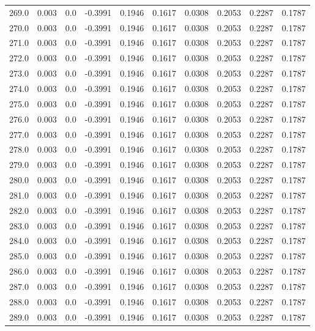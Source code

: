 \begin{longtable}{lrrrrrrrrr}
269.0 & 0.003 & 0.0 & -0.3991 & 0.1946 & 0.1617 & 0.0308 & 0.2053 & 0.2287 & 0.1787 \\
270.0 & 0.003 & 0.0 & -0.3991 & 0.1946 & 0.1617 & 0.0308 & 0.2053 & 0.2287 & 0.1787 \\
271.0 & 0.003 & 0.0 & -0.3991 & 0.1946 & 0.1617 & 0.0308 & 0.2053 & 0.2287 & 0.1787 \\
272.0 & 0.003 & 0.0 & -0.3991 & 0.1946 & 0.1617 & 0.0308 & 0.2053 & 0.2287 & 0.1787 \\
273.0 & 0.003 & 0.0 & -0.3991 & 0.1946 & 0.1617 & 0.0308 & 0.2053 & 0.2287 & 0.1787 \\
274.0 & 0.003 & 0.0 & -0.3991 & 0.1946 & 0.1617 & 0.0308 & 0.2053 & 0.2287 & 0.1787 \\
275.0 & 0.003 & 0.0 & -0.3991 & 0.1946 & 0.1617 & 0.0308 & 0.2053 & 0.2287 & 0.1787 \\
276.0 & 0.003 & 0.0 & -0.3991 & 0.1946 & 0.1617 & 0.0308 & 0.2053 & 0.2287 & 0.1787 \\
277.0 & 0.003 & 0.0 & -0.3991 & 0.1946 & 0.1617 & 0.0308 & 0.2053 & 0.2287 & 0.1787 \\
278.0 & 0.003 & 0.0 & -0.3991 & 0.1946 & 0.1617 & 0.0308 & 0.2053 & 0.2287 & 0.1787 \\
279.0 & 0.003 & 0.0 & -0.3991 & 0.1946 & 0.1617 & 0.0308 & 0.2053 & 0.2287 & 0.1787 \\
280.0 & 0.003 & 0.0 & -0.3991 & 0.1946 & 0.1617 & 0.0308 & 0.2053 & 0.2287 & 0.1787 \\
281.0 & 0.003 & 0.0 & -0.3991 & 0.1946 & 0.1617 & 0.0308 & 0.2053 & 0.2287 & 0.1787 \\
282.0 & 0.003 & 0.0 & -0.3991 & 0.1946 & 0.1617 & 0.0308 & 0.2053 & 0.2287 & 0.1787 \\
283.0 & 0.003 & 0.0 & -0.3991 & 0.1946 & 0.1617 & 0.0308 & 0.2053 & 0.2287 & 0.1787 \\
284.0 & 0.003 & 0.0 & -0.3991 & 0.1946 & 0.1617 & 0.0308 & 0.2053 & 0.2287 & 0.1787 \\
285.0 & 0.003 & 0.0 & -0.3991 & 0.1946 & 0.1617 & 0.0308 & 0.2053 & 0.2287 & 0.1787 \\
286.0 & 0.003 & 0.0 & -0.3991 & 0.1946 & 0.1617 & 0.0308 & 0.2053 & 0.2287 & 0.1787 \\
287.0 & 0.003 & 0.0 & -0.3991 & 0.1946 & 0.1617 & 0.0308 & 0.2053 & 0.2287 & 0.1787 \\
288.0 & 0.003 & 0.0 & -0.3991 & 0.1946 & 0.1617 & 0.0308 & 0.2053 & 0.2287 & 0.1787 \\
289.0 & 0.003 & 0.0 & -0.3991 & 0.1946 & 0.1617 & 0.0308 & 0.2053 & 0.2287 & 0.1787 \\

\end{longtable}
